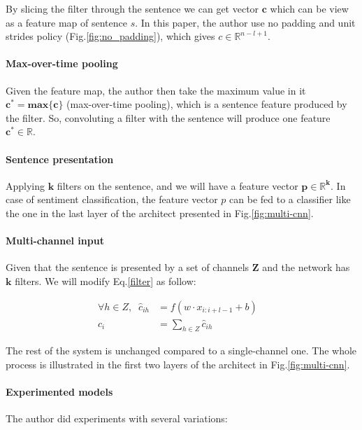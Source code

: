 By slicing the filter through the sentence we can get vector \(\bm{c}\) which can be view as a feature map of sentence \(s\). 
In this paper, the author use no padding and unit strides policy (Fig.\ref{fig:no_padding}), which gives \(c \in \mathbb{R}^{n-l+1}\).

\paragraph{Max-over-time pooling} Given the feature map, the author then take the maximum value in it \(\bm{c^* = max\{c\}}\) (max-over-time pooling\cite{nlp-scratch}), which is a sentence feature produced by the filter.
So, convoluting a filter with the sentence will produce one feature \(\bm{c^* \in \mathbb{R}}\).

\paragraph{Sentence presentation} Applying \(\bm{k}\) filters on the sentence, and we will have a feature vector \(\bm{p \in \mathbb{R}^k}\). 
In case of sentiment classification, the feature vector \(p\) can be fed to a classifier like the one in the last layer of the architect presented in Fig.\ref{fig:multi-cnn}.

\paragraph{Multi-channel input} Given that the sentence is presented by a set of channels \(\bm{Z}\) and the network has \(\bm{k}\) filters. 
We will modify Eq.\eqref{filter} as follow: 

\begin{align}
	\forall h \in Z, \; \; \hat{c}_{ih} &= f(w \cdot x_{i:i+l-1} + b)& \\
	c_i &= \sum_{h \in Z} \hat{c}_{ih}&
\end{align}

The rest of the system is unchanged compared to a single-channel one.
The whole process is illustrated in the first two layers of the architect in Fig.\ref{fig:multi-cnn}.

\paragraph{Experimented models} The author did experiments with several variations:

